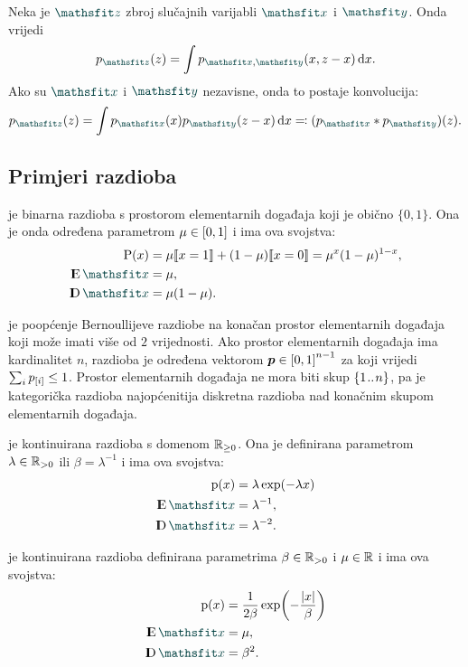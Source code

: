 \documentclass[utf8, diplomski, lmodern]{fer}
\begin{document}
Neka je $\rvar z$ zbroj slučajnih varijabli $\rvar x$ i $\rvar y$. Onda vrijedi
\begin{align}
	p_{\rvar z}(z) = \int p_{\rvar x,\rvar y}(x, z-x)\dif x \text{.}
\end{align}
Ako su $\rvar x$ i $\rvar y$ nezavisne, onda to postaje konvolucija:
\begin{align} \label{eq:nezavisne-gustoce-konvolucija}
p_{\rvar z}(z) = \int p_{\rvar x}(x)p_{\rvar y}(z-x)\dif x \eqqcolon (p_{\rvar x}*p_{\rvar y})(z) \text{.}
\end{align}

\subsection{Primjeri razdioba}

 je binarna razdioba s prostorom elementarnih događaja koji je obično $\{0,1\}$. Ona je onda određena parametrom $\mu\in\intcc{0,1}$ i ima ova svojstva:
\begin{align}
	\P(x) &= \mu \enbbracket{x=1} + (1-\mu) \enbbracket{x=0} = \mu^x(1-\mu)^{1-x}, \\
	\E \rvar x &= \mu, \\
	\D \rvar x &= \mu(1-\mu) \text{.}
\end{align}

 je poopćenje Bernoullijeve razdiobe na konačan prostor elementarnih događaja koji može imati više od $2$ vrijednosti. Ako prostor elementarnih događaja ima kardinalitet $n$, razdioba je određena vektorom $\vec p\in\intcc{0,1}^{n-1}$ za koji vrijedi $\sum_i p_\ind{i}\leq 1$. Prostor elementarnih događaja ne mora biti skup $\cbr{1\bidot n}$, pa je kategorička razdioba najopćenitija diskretna razdioba nad konačnim skupom elementarnih događaja.

 je kontinuirana razdioba s domenom $\mathbb{R}_{\geq0}$. Ona je definirana parametrom $\lambda\in\mathbb{R}_{>0}$ ili $\beta=\lambda^{-1}$ i ima ova svojstva:
\begin{align}
\p(x) &= \lambda\exp(-\lambda x) \\
\E \rvar x &= \lambda^{-1}, \\
\D \rvar x &= \lambda^{-2} \text{.}
\end{align}

 je kontinuirana razdioba definirana parametrima $\beta\in\mathbb{R}_{>0}$ i $\mu \in \mathbb{R}$ i ima ova svojstva:
\begin{align}
\p(x) &= \frac{1}{2\beta}\exp\del{-\frac{\envert{x}}{\beta}} \\
\E \rvar x &= \mu, \\
\D \rvar x &= \beta^2 \text{.}
\end{align}
\end{document}
